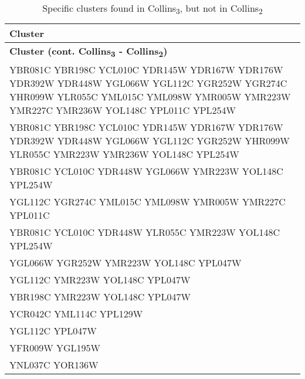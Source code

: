 \setlength{\extrarowheight}{2pt}
\renewcommand{\arraystretch}{1.2}
\begin{longtable}{| m{27em} |}
\caption{Specific clusters found in Collins\textsubscript{3}, but not in Collins\textsubscript{2}} \\
\hline
\textbf{Cluster} \\
\hline
\endfirsthead
\hline
\textbf{Cluster (cont. Collins\textsubscript{3} - Collins\textsubscript{2})} \\
\hline
\endhead
\hline
\endfoot
\hline
\endlastfoot
YBR081C YBR198C YCL010C YDR145W YDR167W YDR176W YDR392W YDR448W YGL066W YGL112C YGR252W YGR274C YHR099W YLR055C YML015C YML098W YMR005W YMR223W YMR227C YMR236W YOL148C YPL011C YPL254W \\
\hline
YBR081C YBR198C YCL010C YDR145W YDR167W YDR176W YDR392W YDR448W YGL066W YGL112C YGR252W YHR099W YLR055C YMR223W YMR236W YOL148C YPL254W \\
\hline
YBR081C YCL010C YDR448W YGL066W YMR223W YOL148C YPL254W \\
\hline
YGL112C YGR274C YML015C YML098W YMR005W YMR227C YPL011C \\
\hline
YBR081C YCL010C YDR448W YLR055C YMR223W YOL148C YPL254W \\
\hline
YGL066W YGR252W YMR223W YOL148C YPL047W \\
\hline
YGL112C YMR223W YOL148C YPL047W \\
\hline
YBR198C YMR223W YOL148C YPL047W \\
\hline
YCR042C YML114C YPL129W \\
\hline
YGL112C YPL047W \\
\hline
YFR009W YGL195W \\
\hline
YNL037C YOR136W \\
\hline
\end{longtable}